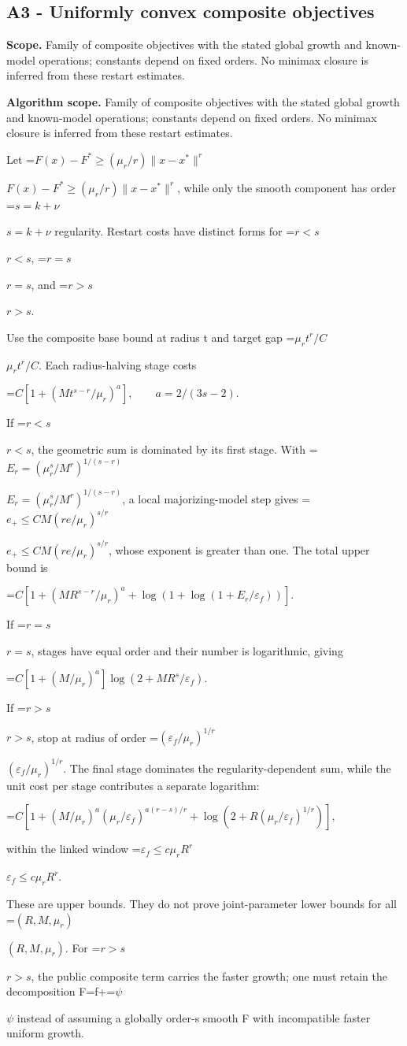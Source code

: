 \documentclass[10pt,a4paper]{article}
\newcommand{\AtlasMath}[1]{\par\begingroup\centering\setbox0=\hbox{$\displaystyle #1$}\ifdim\wd0>1.4\linewidth\typeout{ATLAS WIDE FORMULA: \the\wd0}\fi\ifdim\wd0>\linewidth\resizebox{\linewidth}{!}{\box0}\else\box0\fi\par\endgroup}
\newcommand{\AtlasInlineMath}[1]{\begingroup\setbox0=\hbox{$#1$}\ifdim\wd0>.4\linewidth\endgroup\AtlasMath{#1}\else\endgroup$#1$\fi}
\begin{document}
\subsection{A3 - Uniformly convex composite objectives}
\textbf{Scope.} Family of composite objectives with the stated global growth and known-model operations; constants depend on fixed orders. No minimax closure is inferred from these restart estimates.

\textbf{Algorithm scope.} Family of composite objectives with the stated global growth and known-model operations; constants depend on fixed orders. No minimax closure is inferred from these restart estimates.

Let \AtlasInlineMath{F(x)-F^*\ge(\mu_r/r)\|x-x^*\|^r}, while only the smooth component has order \AtlasInlineMath{s=k+\nu} regularity. Restart costs have distinct forms for \AtlasInlineMath{r<s}, \AtlasInlineMath{r=s}, and \AtlasInlineMath{r>s}.

Use the composite base bound at radius t and target gap \AtlasInlineMath{\mu_rt^r/C}. Each radius-halving stage costs

\AtlasMath{C[1+(Mt^{s-r}/\mu_r)^a],\qquad a=2/(3s-2).}

If \AtlasInlineMath{r<s}, the geometric sum is dominated by its first stage. With \AtlasInlineMath{E_r=(\mu_r^s/M^r)^{1/(s-r)}}, a local majorizing-model step gives \AtlasInlineMath{e_+\le CM(re/\mu_r)^{s/r}}, whose exponent is greater than one. The total upper bound is

\AtlasMath{C\left[1+(MR^{s-r}/\mu_r)^a+\log\left(1+\log(1+E_r/\varepsilon_f)\right)\right].}

If \AtlasInlineMath{r=s}, stages have equal order and their number is logarithmic, giving

\AtlasMath{C[1+(M/\mu_r)^a]\log(2+MR^s/\varepsilon_f).}

If \AtlasInlineMath{r>s}, stop at radius of order \AtlasInlineMath{(\varepsilon_f/\mu_r)^{1/r}}. The final stage dominates the regularity-dependent sum, while the unit cost per stage contributes a separate logarithm:

\AtlasMath{C\left[1+(M/\mu_r)^a(\mu_r/\varepsilon_f)^{a(r-s)/r}+\log\left(2+R(\mu_r/\varepsilon_f)^{1/r}\right)\right],}

within the linked window \AtlasInlineMath{\varepsilon_f\le c\mu_rR^r}.

These are upper bounds. They do not prove joint-parameter lower bounds for all \AtlasInlineMath{(R,M,\mu_r)}. For \AtlasInlineMath{r>s}, the public composite term carries the faster growth; one must retain the decomposition F=f+\AtlasInlineMath{\psi} instead of assuming a globally order-s smooth F with incompatible faster uniform growth.
\end{document}
